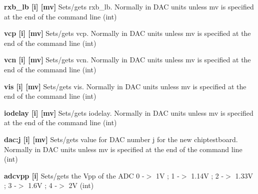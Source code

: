 \begin{DoxyItemize}
\item {\bfseries rxb\_\-lb \mbox{[}i\mbox{]} \mbox{[}mv\mbox{]}} Sets/gets rxb\_\-lb. Normally in DAC units unless {\ttfamily mv} is specified at the end of the command line (int)
\end{DoxyItemize}


\begin{DoxyItemize}
\item {\bfseries vcp \mbox{[}i\mbox{]} \mbox{[}mv\mbox{]}} Sets/gets vcp. Normally in DAC units unless {\ttfamily mv} is specified at the end of the command line (int)
\end{DoxyItemize}


\begin{DoxyItemize}
\item {\bfseries vcn \mbox{[}i\mbox{]} \mbox{[}mv\mbox{]}} Sets/gets vcn. Normally in DAC units unless {\ttfamily mv} is specified at the end of the command line (int)
\end{DoxyItemize}


\begin{DoxyItemize}
\item {\bfseries vis \mbox{[}i\mbox{]} \mbox{[}mv\mbox{]}} Sets/gets vis. Normally in DAC units unless {\ttfamily mv} is specified at the end of the command line (int)
\end{DoxyItemize}


\begin{DoxyItemize}
\item {\bfseries iodelay \mbox{[}i\mbox{]} \mbox{[}mv\mbox{]}} Sets/gets iodelay. Normally in DAC units unless {\ttfamily mv} is specified at the end of the command line (int)
\end{DoxyItemize}


\begin{DoxyItemize}
\item {\bfseries dac:j \mbox{[}i\mbox{]} \mbox{[}mv\mbox{]}} Sets/gets value for DAC number j for the new chiptestboard. Normally in DAC units unless {\ttfamily mv} is specified at the end of the command line (int)
\end{DoxyItemize}


\begin{DoxyItemize}
\item {\bfseries adcvpp \mbox{[}i\mbox{]} } Sets/gets the Vpp of the ADC 0 -\/$>$ 1V ; 1 -\/$>$ 1.14V ; 2 -\/$>$ 1.33V ; 3 -\/$>$ 1.6V ; 4 -\/$>$ 2V (int)
\end{DoxyItemize}


